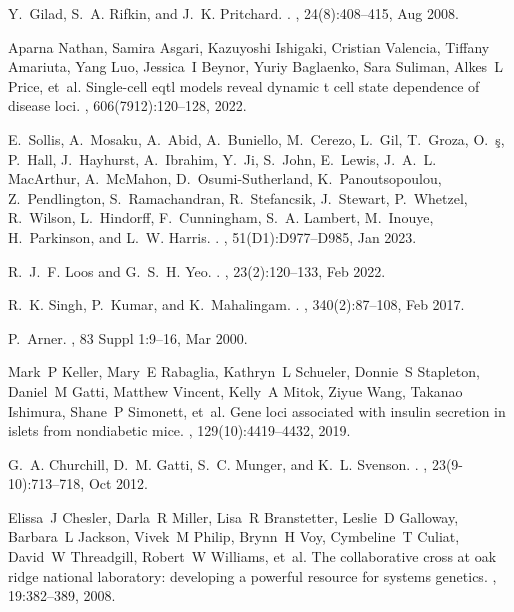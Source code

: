 \documentclass[
]{article}
\begin{document}
\begin{thebibliography}{100}
Y.~Gilad, S.~A. Rifkin, and J.~K. Pritchard.
.
, 24(8):408--415, Aug 2008.

Aparna Nathan, Samira Asgari, Kazuyoshi Ishigaki, Cristian Valencia, Tiffany
  Amariuta, Yang Luo, Jessica~I Beynor, Yuriy Baglaenko, Sara Suliman, Alkes~L
  Price, et~al.
\newblock Single-cell eqtl models reveal dynamic t cell state dependence of
  disease loci.
, 606(7912):120--128, 2022.

E.~Sollis, A.~Mosaku, A.~Abid, A.~Buniello, M.~Cerezo, L.~Gil, T.~Groza, O.~{\c
  s}, P.~Hall, J.~Hayhurst, A.~Ibrahim, Y.~Ji, S.~John, E.~Lewis, J.~A.~L.
  MacArthur, A.~McMahon, D.~Osumi-Sutherland, K.~Panoutsopoulou,
  Z.~Pendlington, S.~Ramachandran, R.~Stefancsik, J.~Stewart, P.~Whetzel,
  R.~Wilson, L.~Hindorff, F.~Cunningham, S.~A. Lambert, M.~Inouye,
  H.~Parkinson, and L.~W. Harris.
.
, 51(D1):D977--D985, Jan 2023.

R.~J.~F. Loos and G.~S.~H. Yeo.
.
, 23(2):120--133, Feb 2022.

R.~K. Singh, P.~Kumar, and K.~Mahalingam.
.
, 340(2):87--108, Feb 2017.

P.~Arner.
, 83 Suppl 1:9--16, Mar 2000.

Mark~P Keller, Mary~E Rabaglia, Kathryn~L Schueler, Donnie~S Stapleton,
  Daniel~M Gatti, Matthew Vincent, Kelly~A Mitok, Ziyue Wang, Takanao Ishimura,
  Shane~P Simonett, et~al.
\newblock Gene loci associated with insulin secretion in islets from
  nondiabetic mice.
, 129(10):4419--4432,
  2019.

G.~A. Churchill, D.~M. Gatti, S.~C. Munger, and K.~L. Svenson.
.
, 23(9-10):713--718, Oct 2012.

Elissa~J Chesler, Darla~R Miller, Lisa~R Branstetter, Leslie~D Galloway,
  Barbara~L Jackson, Vivek~M Philip, Brynn~H Voy, Cymbeline~T Culiat, David~W
  Threadgill, Robert~W Williams, et~al.
\newblock The collaborative cross at oak ridge national laboratory: developing
  a powerful resource for systems genetics.
, 19:382--389, 2008.


\end{thebibliography}
\end{document}
